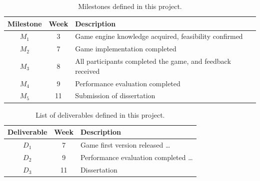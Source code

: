\documentclass[a4paper,11pt]{article}
\begin{document}
\begin{table}[htbp]
    \begin{center}
        \begin{tabular}{|c|c|l|}
        \hline
        \textbf{Milestone} & \textbf{Week} & \textbf{Description} \\
        \hline
        $M_1$ & 3 & Game engine knowledge acquired, feasibility confirmed \\
        $M_2$ & 7 & Game implementation completed \\
        $M_3$ & 8 & All participants completed the game, and feedback received  \\
        $M_4$ & 9 & Performance evaluation completed \\
        $M_5$ & 11 & Submission of dissertation \\
        \hline
        \end{tabular} 
    \end{center}
    \caption{Milestones defined in this project.}
    \label{fig:milestones}
\end{table}

\begin{table}[htbp]
    \begin{center}
        \begin{tabular}{|c|c|l|}
        \hline
        \textbf{Deliverable} & \textbf{Week} & \textbf{Description} \\
        \hline
        $D_1$ & 7 & Game first version released \dots\\
        $D_2$ & 9 & Performance evaluation completed  \dots\\
        $D_3$ & 11 & Dissertation \\
        \hline
        \end{tabular} 
    \end{center}
    \caption{List of deliverables defined in this project.}
    \label{fig:deliverables}
\end{table}



{\small
}
\end{document}
